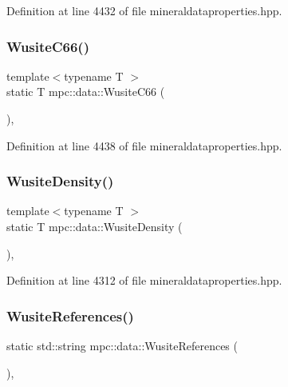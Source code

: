Definition at line 4432 of file mineraldataproperties.\+hpp.

\mbox{\label{namespacempc_1_1data_a4e5fc93edff67c7a03b8f27940bd664d}} 
\subsubsection{\texorpdfstring{Wusite\+C66()}{WusiteC66()}}
{\footnotesize\ttfamily template$<$typename T $>$ \\
static T mpc\+::data\+::\+Wusite\+C66 (\begin{DoxyParamCaption}{ }\end{DoxyParamCaption})\hspace{0.3cm}{\ttfamily [inline]}, {\ttfamily [static]}}



Definition at line 4438 of file mineraldataproperties.\+hpp.

\mbox{\label{namespacempc_1_1data_ae5d0022de35d082c6cee2da5c2d17e35}} 
\subsubsection{\texorpdfstring{Wusite\+Density()}{WusiteDensity()}}
{\footnotesize\ttfamily template$<$typename T $>$ \\
static T mpc\+::data\+::\+Wusite\+Density (\begin{DoxyParamCaption}{ }\end{DoxyParamCaption})\hspace{0.3cm}{\ttfamily [inline]}, {\ttfamily [static]}}



Definition at line 4312 of file mineraldataproperties.\+hpp.

\mbox{\label{namespacempc_1_1data_a37620d942125f180252c5e13c993630e}} 
\subsubsection{\texorpdfstring{Wusite\+References()}{WusiteReferences()}}
{\footnotesize\ttfamily static std\+::string mpc\+::data\+::\+Wusite\+References (\begin{DoxyParamCaption}{ }\end{DoxyParamCaption})\hspace{0.3cm}{\ttfamily [inline]}, {\ttfamily [static]}}



